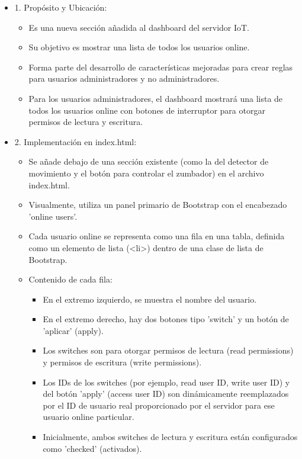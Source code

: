\documentclass{report}
\begin{document}
\begin{itemize}
    \item 1. Propósito y Ubicación:
    \begin{itemize}
        \item Es una nueva sección añadida al dashboard del servidor IoT.
        \item Su objetivo es mostrar una lista de todos los usuarios online.
        \item Forma parte del desarrollo de características mejoradas para crear reglas para usuarios administradores y no administradores.
        \item Para los usuarios administradores, el dashboard mostrará una lista de todos los usuarios online con botones de interruptor para otorgar 
        permisos de lectura y escritura.
    \end{itemize}
    \item 2. Implementación en index.html:
    \begin{itemize}
        \item Se añade debajo de una sección existente (como la del detector de movimiento y el botón para controlar el zumbador) en el archivo index.html.
        \item Visualmente, utiliza un panel primario de Bootstrap con el encabezado 'online users'.
        \item Cada usuario online se representa como una fila en una tabla, definida como un elemento de lista (<li>) dentro de una clase de lista de Bootstrap.
        \item Contenido de cada fila:
            \begin{itemize}
                \item En el extremo izquierdo, se muestra el nombre del usuario.
                \item En el extremo derecho, hay dos botones tipo 'switch' y un botón de 'aplicar' (apply).
                \item Los switches son para otorgar permisos de lectura (read permissions) y permisos de escritura (write permissions).
                \item Los IDs de los switches (por ejemplo, read user ID, write user ID) y del botón 'apply' (access user ID) son dinámicamente 
                reemplazados por el ID de usuario real proporcionado por el servidor para ese usuario online particular.
                \item Inicialmente, ambos switches de lectura y escritura están configurados como 'checked' (activados).

\end{itemize}
\end{itemize}
\end{itemize}
\end{document}
